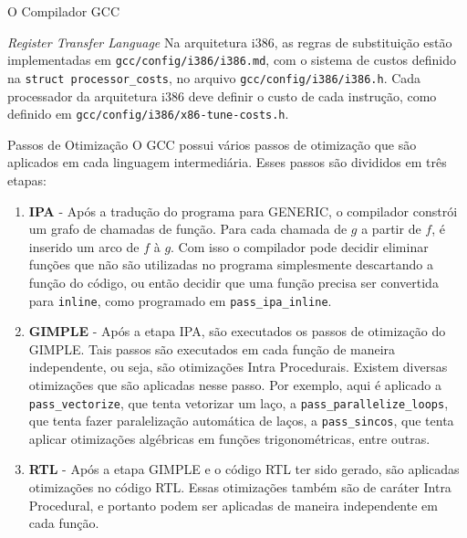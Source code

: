 \begin{section}{O Compilador GCC}
\begin{subsection}{\textit{Register Transfer Language}}
    Na arquitetura i386, as regras de substituição estão implementadas
em \texttt{gcc/config/i386/i386.md}, com o sistema de custos definido
na \texttt{struct processor\_costs}, no arquivo \texttt{gcc/config/i386/i386.h}.
Cada processador da arquitetura i386 deve definir o custo de cada instrução,
como definido em \texttt{gcc/config/i386/x86-tune-costs.h}.

\end{subsection}

\begin{subsection}{Passos de Otimização}
    O GCC possui vários passos de otimização que são aplicados em cada linguagem
intermediária. Esses passos são divididos em três etapas:

    \begin{enumerate}
        \item \textbf{IPA} - Após a tradução do programa para GENERIC, o
            compilador constrói um grafo de chamadas de função. Para cada
            chamada de $g$ a partir de $f$, é inserido um arco de $f$ à $g$.
            Com isso o compilador pode decidir eliminar funções que não são
            utilizadas no programa simplesmente descartando a função do
            código, ou então decidir que uma função precisa ser convertida para
            \texttt{inline}, como programado em \texttt{pass\_ipa\_inline}.

        \item \textbf{GIMPLE} - Após a etapa IPA, são executados os passos
            de otimização do GIMPLE. Tais passos são executados em cada
            função de maneira independente, ou seja, são otimizações
            Intra Procedurais.
            Existem diversas otimizações que são aplicadas nesse passo.
            Por exemplo, aqui é aplicado a \texttt{pass\_vectorize},
            que tenta vetorizar um laço, a \texttt{pass\_parallelize\_loops},
            que tenta fazer paralelização automática de laços, a
            \texttt{pass\_sincos}, que tenta aplicar otimizações algébricas em
            funções trigonométricas, entre outras.

        \item \textbf{RTL} - Após a etapa GIMPLE e o código RTL ter sido gerado,
            são aplicadas otimizações no código RTL. Essas otimizações também são
            de caráter Intra Procedural, e portanto podem ser aplicadas de maneira
            independente em cada função.
    \end{enumerate}


\end{subsection}
\end{section}
